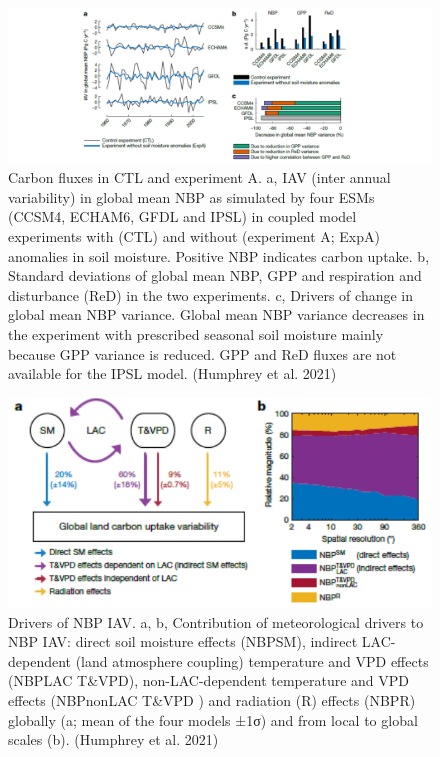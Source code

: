 \documentclass[12pt,oneside]{book}
\begin{document}
\begin{figure}

{\centering \includegraphics[width=0.8\linewidth]{figures/chap9/f98_humphrey1} 

}

\caption{Carbon fluxes in CTL and experiment A. a, IAV (inter annual variability) in global mean NBP as simulated by four ESMs (CCSM4, ECHAM6, GFDL and IPSL) in coupled model experiments with (CTL) and without (experiment A; ExpA) anomalies in soil moisture. Positive NBP indicates carbon uptake. b, Standard deviations of global mean NBP, GPP and respiration and disturbance (ReD) in the two experiments. c, Drivers of change in global mean NBP variance. Global mean NBP variance decreases in the experiment with prescribed seasonal soil moisture mainly because GPP variance is reduced. GPP and ReD fluxes are not available for the IPSL model. (Humphrey et al. 2021)}\label{fig:f98}
\end{figure}

\begin{figure}

{\centering \includegraphics[width=0.8\linewidth]{figures/chap9/f99_humprey2} 

}

\caption{Drivers of NBP IAV. a, b, Contribution of meteorological drivers to NBP IAV: direct soil moisture effects (NBPSM), indirect LAC-dependent (land atmosphere coupling) temperature and VPD effects (NBPLAC T\&VPD), non-LAC-dependent temperature and VPD effects (NBPnonLAC T\&VPD ) and radiation (R) effects (NBPR) globally (a; mean of the four models ±1σ) and from local to global scales (b). (Humphrey et al. 2021)}\label{fig:f99}
\end{figure}
\end{document}
